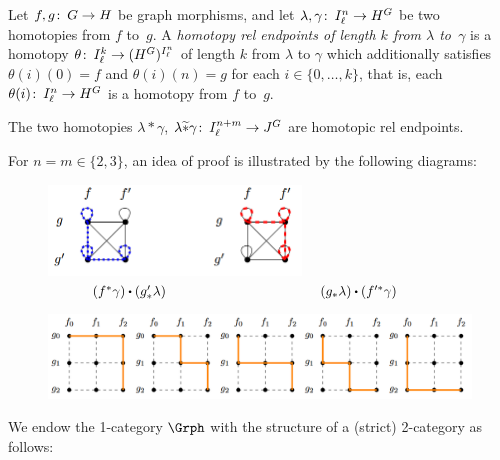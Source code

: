 \documentclass[11pt,a4paper]{article}
\begin{document}
	\begin{defi}
		Let $f,g\colon\thinspace G\to H$ be graph morphisms, and let $\lambda,\gamma\colon\thinspace I^n_\ell\to H^G$ be two homotopies from $f$ to~$g$.
		A \textit{homotopy rel endpoints of length $k$ from $\lambda$ to~$\gamma$} is a homotopy $\theta\colon\thinspace I^k_\ell\to (H^G)^{I^n_\ell}$ of length $k$ from $\lambda$ to $\gamma$ which additionally satisfies $\theta(i)(0)=f$ and $\theta(i)(n)=g$ for each $i\in\{0,\dots,k\}$, that is, each $\theta(i)\colon\thinspace I^n_\ell\to H^G$ is a homotopy from $f$ to~$g$.
	\end{defi}

	\begin{prop}
		The two homotopies $\lambda\ast\gamma$, $\lambda\widetilde{\ast}\gamma\colon\thinspace I^{n+m}_\ell\to J^G$ are homotopic rel endpoints.
	\end{prop}
		
	For $n=m\in\{2,3\}$, an idea of proof is illustrated by the following diagrams:
	\begin{figure}[H]
		\centering
		\includegraphics[width=0.6\textwidth]{figures/homotopy-n-m-2}
		\caption*{$\hspace{1cm} (f^\ast\gamma)\bigcdot(g'_\ast\lambda) \hspace{4cm} (g_\ast\lambda)\bigcdot(f'^\ast\gamma)$}
	\end{figure}

	\begin{figure}[H]
		\centering
		\includegraphics[width=\textwidth]{figures/homotopy-n-m-3}
	\end{figure}

	We endow the 1-category $\Grph$ with the structure of a (strict) 2-category as follows:
	
\end{document}
